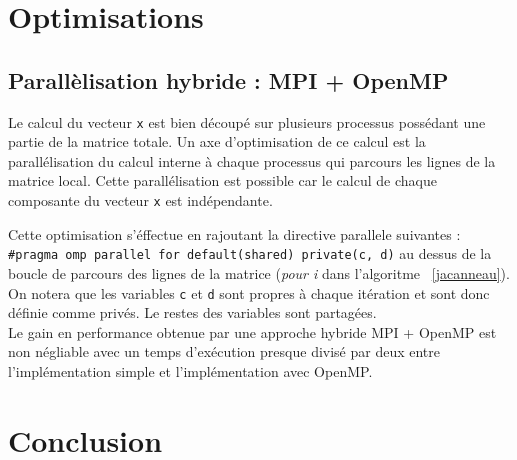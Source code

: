 \documentclass[a4paper]{article}
\begin{document}
\section{Optimisations}

\subsection{Parallèlisation hybride : MPI + OpenMP}
Le calcul du vecteur \texttt{x} est bien découpé sur plusieurs processus possédant
une partie de la matrice totale. Un axe d'optimisation de ce calcul est la
parallélisation du calcul interne à chaque processus qui parcours les lignes de la
matrice local. Cette parallélisation est possible car le calcul de chaque 
composante du vecteur \texttt{x} est indépendante.

Cette optimisation s'éffectue en rajoutant la directive parallele suivantes : \\
\verb|#pragma omp parallel for default(shared) private(c, d)| au dessus de la
boucle de parcours des lignes de la matrice (\emph{pour i} dans l'algoritme~
\ref{jacanneau}). On notera que les variables \texttt{c} et \texttt{d} sont
propres à chaque itération et sont donc définie comme privés. Le restes des
variables sont partagées.\\

Le gain en performance obtenue par une approche hybride MPI + OpenMP est non
négliable avec un temps d'exécution presque divisé par deux entre l'implémentation
simple et l'implémentation avec OpenMP.

\section{Conclusion}
\end{document}
